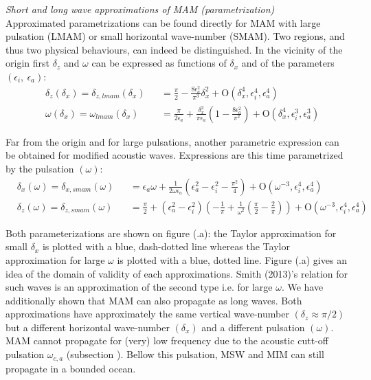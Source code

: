\documentclass[a4paper,11pt]{article}
\begin{document}
\textit{Short and long wave approximations of MAM (parametrization)}\\

Approximated parametrizations can be found directly for MAM with large pulsation (LMAM) or small horizontal wave-number (SMAM). Two regions, and thus two physical behaviours, can indeed be distinguished. In the vicinity of the origin first $\delta_z$ and $\omega$ can be expressed as functions of $\delta_x$ and of the parameters $(\epsilon_i,\ \epsilon_a)$:
\begin{subequations}
	\label{ParamAcousModes1}
	\begin{alignat}{2}	
		\label{ParamLMAM1}
		&\delta_{z}(\delta_x)=\delta_{z,lmam}(\delta_x) &&= \frac{\pi}{2} 
		-\frac{8\epsilon_a^2}{\pi^3}\delta_x^2
	+\mathrm{O}	(\delta_x^4,\epsilon_i^4,\epsilon_a^4)\\[3mm]
		\label{ParamLMAM2}
	    &\omega(\delta_x)=\omega_{lmam}(\delta_x) &&= \frac{\pi}{2\epsilon_a}
	    +\frac{\delta_x^2}{\pi\epsilon_a} 
	    \left(1
	    -\frac{8\epsilon_a^2}{\pi^2} \right)
	    +\mathrm{O}	(\delta_x^4,\epsilon_i^3,\epsilon_a^3)
	\end{alignat}
\end{subequations}

Far from the origin and for large pulsations, another parametric expression can be obtained for modified acoustic waves. Expressions are this time parametrized by the pulsation $(\omega)$:
\begin{subequations}
	   \label{ParamAcousModes2}
	\begin{alignat}{2}	
		\label{ParamSMAM1}
		&\delta_{x}(\omega)=\delta_{x,smam}(\omega) &&= \epsilon_a \omega
		+\frac{1}{2\omega\epsilon_a}\left( 
		\epsilon_a^2-\epsilon_i^2-\frac{\pi^2}{4}
		\right)
		+\mathrm{O}	(\omega^{-3},\epsilon_i^4,\epsilon_a^4)
		\\[3mm]
		\label{ParamSMAM2}
		&\delta_{z}(\omega)=\delta_{z,smam}(\omega) &&= \frac{\pi}{2}
		+(\epsilon_a^2-\epsilon_i^2)
		\left(-\frac{1}{\pi}
		+\frac{1}{\omega^2}\left(
		\frac{\pi}{2}-\frac{2}{\pi}\right)
		\right)
		+\mathrm{O}	(\omega^{-3},\epsilon_i^4,\epsilon_a^4)
	\end{alignat}
\end{subequations}

Both parameterizations are shown on figure (.a): the Taylor approximation for small $\delta_x$ is plotted with a blue, dash-dotted line whereas the Taylor approximation for large $\omega$ is plotted with a blue, dotted line. Figure (.a) gives an idea of the domain of validity of each approximations. Smith (2013)'s relation for such waves is an approximation of the second type i.e. for large $\omega$. We have additionally shown that MAM can also propagate as long waves. Both approximations have approximately the same vertical wave-number $(\delta_z \approx \pi/2)$ but a different horizontal wave-number $(\delta_x)$ and a different pulsation $(\omega)$.
MAM cannot propagate for (very) low frequency due to the acoustic cutt-off pulsation $\omega_{c,a}$ (subsection ). Bellow this pulsation, MSW and MIM can still propagate in a bounded ocean.
\end{document}
